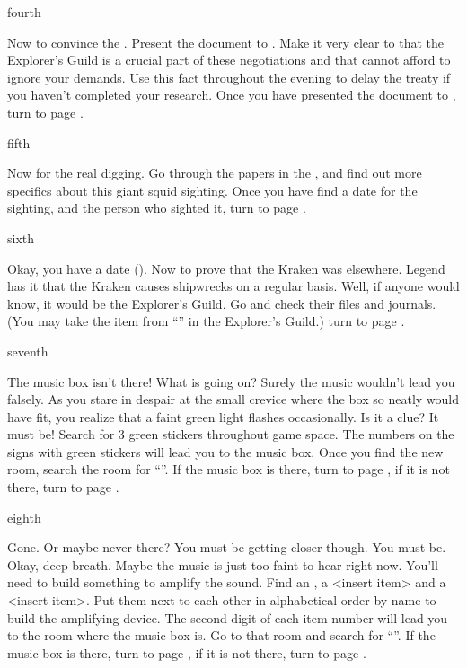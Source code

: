 \documentclass[greennotebook]{NeptuneBall}
\begin{document}
\begin{page}{fourth}

Now to convince the \cKing{\King}. Present the document to \cKing{\King} \cKing{}. Make it very clear to \cKing{\them} that the Explorer's Guild is a crucial part of these negotiations and that \cKing{\they} cannot afford to ignore your demands. Use this fact throughout the evening to delay the treaty if you haven't completed your research. Once you have presented the document to \cKing{}, turn to page .

\end{page}

\begin{page}{fifth}

Now for the real digging. Go through the papers in the \sEmbassy{}, and find out more specifics about this giant squid sighting. Once you have find a date for the sighting, and the person who sighted it, turn to page .

\end{page}

\begin{page}{sixth}

Okay, you have a date (\cKraken{\MYname}). Now to prove that the Kraken was elsewhere. Legend has it that the Kraken causes shipwrecks on a regular basis. Well, if anyone would know, it would be the Explorer's Guild. Go and check their files and journals. (You may take the item from ``\sJournals{}'' in the Explorer's Guild.)  turn to page .

\end{page}

\begin{page}{seventh}

The music box isn't there! What is going on? Surely the music wouldn't lead you falsely. As you stare in despair at the small crevice where the box so neatly would have fit, you realize that a faint green light flashes occasionally. Is it a clue? It must be!  Search for 3 green stickers throughout game space. The numbers on the signs with green stickers will lead you to the music box. Once you find the new room, search the room for ``\sPacketB{}''. If the music box is there, turn to page , if it is not there, turn to page .

\end{page}

\begin{page}{eighth}

Gone. Or maybe never there? You must be getting closer though. You must be. Okay, deep breath. Maybe the music is just too faint to hear right now. You'll need to build something to amplify the sound. Find an \iConch{}, a <insert item> and a <insert item>. Put them next to each other in alphabetical order by name to build the amplifying device. The second digit of each item number will lead you to the room where the music box is. Go to that room and search for ``\sPacketC{}''. If the music box is there, turn to page , if it is not there, turn to page .

\end{page}
\end{document}
